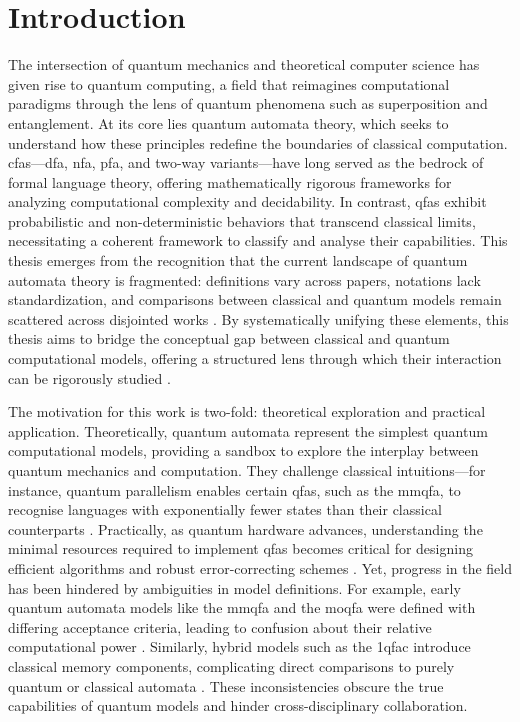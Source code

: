 \chapter{Introduction}  
\label{chap:introduction}

The intersection of quantum mechanics and theoretical computer science has given rise to quantum computing, a field that reimagines computational paradigms through the lens of quantum phenomena such as superposition and entanglement. At its core lies quantum automata theory, which seeks to understand how these principles redefine the boundaries of classical computation. \glspl{cfa}—\gls{dfa}, \gls{nfa}, \gls{pfa}, and two-way variants—have long served as the bedrock of formal language theory, offering mathematically rigorous frameworks for analyzing computational complexity and decidability. In contrast, \glspl{qfa} exhibit probabilistic and non-deterministic behaviors that transcend classical limits, necessitating a coherent framework to classify and analyse their capabilities. This thesis emerges from the recognition that the current landscape of quantum automata theory is fragmented: definitions vary across papers, notations lack standardization, and comparisons between classical and quantum models remain scattered across disjointed works \cite{gruska2012quantum}. By systematically unifying these elements, this thesis aims to bridge the conceptual gap between classical and quantum computational models, offering a structured lens through which their interaction can be rigorously studied \cite{ambainis2009superiority}.  

The motivation for this work is two-fold: theoretical exploration and practical application. Theoretically, quantum automata represent the simplest quantum computational models, providing a sandbox to explore the interplay between quantum mechanics and computation. They challenge classical intuitions—for instance, quantum parallelism enables certain \glspl{qfa}, such as the \gls{mmqfa}, to recognise languages with exponentially fewer states than their classical counterparts \cite{ambainis1998one}. Practically, as quantum hardware advances, understanding the minimal resources required to implement \glspl{qfa} becomes critical for designing efficient algorithms and robust error-correcting schemes \cite{nielsen2010quantum}. Yet, progress in the field has been hindered by ambiguities in model definitions. For example, early quantum automata models like the \gls{mmqfa} and the \gls{moqfa} were defined with differing acceptance criteria, leading to confusion about their relative computational power \cite{kondacs1997power}. Similarly, hybrid models such as the \gls{1qfac} introduce classical memory components, complicating direct comparisons to purely quantum or classical automata \cite{li2012characterizations}. These inconsistencies obscure the true capabilities of quantum models and hinder cross-disciplinary collaboration.

